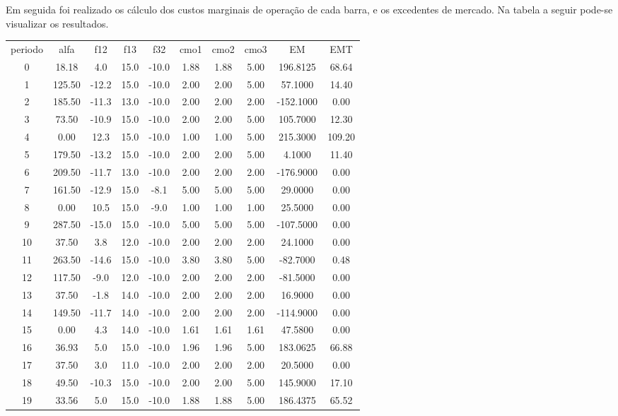 \documentclass[a4paper,12pt,twoside]{article}
\begin{document}
Em seguida foi realizado os cálculo dos custos marginais de operação de cada barra,
e os excedentes de mercado.
Na tabela a seguir pode-se visualizar os resultados.

\begin{center}
    \begin{tabular}{ c c c c c c c c c c }
        periodo & alfa   & f12   & f13   & f32  & cmo1  & cmo2  & cmo3        & EM     & EMT \\
        0    & 18.18   & 4.0  & 15.0 & -10.0  & 1.88  & 1.88  & 5.00  & 196.8125   & 68.64 \\
        1   & 125.50 & -12.2  & 15.0 & -10.0  & 2.00  & 2.00  & 5.00   & 57.1000   & 14.40 \\
        2   & 185.50 & -11.3  & 13.0 & -10.0  & 2.00  & 2.00  & 2.00 & -152.1000    & 0.00 \\
        3    & 73.50 & -10.9  & 15.0 & -10.0  & 2.00  & 2.00  & 5.00  & 105.7000   & 12.30 \\
        4     & 0.00  & 12.3  & 15.0 & -10.0  & 1.00  & 1.00  & 5.00  & 215.3000  & 109.20 \\
        5   & 179.50 & -13.2  & 15.0 & -10.0  & 2.00  & 2.00  & 5.00    & 4.1000   & 11.40 \\
        6   & 209.50 & -11.7  & 13.0 & -10.0  & 2.00  & 2.00  & 2.00 & -176.9000    & 0.00 \\
        7   & 161.50 & -12.9  & 15.0  & -8.1  & 5.00  & 5.00  & 5.00   & 29.0000    & 0.00 \\
        8     & 0.00  & 10.5  & 15.0  & -9.0  & 1.00  & 1.00  & 1.00   & 25.5000    & 0.00 \\
        9   & 287.50 & -15.0  & 15.0 & -10.0  & 5.00  & 5.00  & 5.00 & -107.5000    & 0.00 \\
        10   & 37.50   & 3.8  & 12.0 & -10.0  & 2.00  & 2.00  & 2.00   & 24.1000    & 0.00 \\
        11  & 263.50 & -14.6  & 15.0 & -10.0  & 3.80  & 3.80  & 5.00  & -82.7000    & 0.48 \\
        12  & 117.50  & -9.0  & 12.0 & -10.0  & 2.00  & 2.00  & 2.00  & -81.5000    & 0.00 \\
        13   & 37.50  & -1.8  & 14.0 & -10.0  & 2.00  & 2.00  & 2.00   & 16.9000    & 0.00 \\
        14  & 149.50 & -11.7  & 14.0 & -10.0  & 2.00  & 2.00  & 2.00 & -114.9000    & 0.00 \\
        15    & 0.00   & 4.3  & 14.0 & -10.0  & 1.61  & 1.61  & 1.61   & 47.5800    & 0.00 \\
        16   & 36.93   & 5.0  & 15.0 & -10.0  & 1.96  & 1.96  & 5.00  & 183.0625   & 66.88 \\
        17   & 37.50   & 3.0  & 11.0 & -10.0  & 2.00  & 2.00  & 2.00   & 20.5000    & 0.00 \\
        18   & 49.50 & -10.3  & 15.0 & -10.0  & 2.00  & 2.00  & 5.00  & 145.9000   & 17.10 \\
        19   & 33.56   & 5.0  & 15.0 & -10.0  & 1.88  & 1.88  & 5.00  & 186.4375   & 65.52
    \end{tabular}
\end{center}
\end{document}
